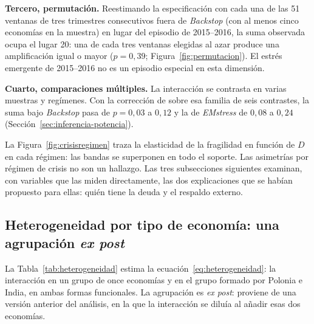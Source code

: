 \textbf{Tercero, permutación.} Reestimando la especificación con cada una de las 51 ventanas de tres trimestres consecutivos fuera de \textit{Backstop} (con al menos cinco economías en la muestra) en lugar del episodio de 2015--2016, la suma observada ocupa el lugar 20: una de cada tres ventanas elegidas al azar produce una amplificación igual o mayor ($p=0{,}39$; Figura~\ref{fig:permutacion}). El estrés emergente de 2015--2016 no es un episodio especial en esta dimensión.


\textbf{Cuarto, comparaciones múltiples.} La interacción se contrasta en varias muestras y regímenes. Con la corrección de \citet{Holm1979} sobre esa familia de seis contrastes, la suma bajo \textit{Backstop} pasa de $p=0{,}03$ a $0{,}12$ y la de \textit{EMstress} de $0{,}08$ a $0{,}24$ (Sección~\ref{sec:inferencia-potencia}).

La Figura~\ref{fig:crisisregimen} traza la elasticidad de la fragilidad en función de $D$ en cada régimen: las bandas se superponen en todo el soporte. Las asimetrías por régimen de crisis no son un hallazgo. Las tres subsecciones siguientes examinan, con variables que las miden directamente, las dos explicaciones que se habían propuesto para ellas: quién tiene la deuda y el respaldo externo.


\subsection{Heterogeneidad por tipo de economía: una agrupación \textit{ex post}}
\label{sec:robustez-heterogeneidad}

La Tabla~\ref{tab:heterogeneidad} estima la ecuación~\eqref{eq:heterogeneidad}: la interacción en un grupo de once economías y en el grupo formado por Polonia e India, en ambas formas funcionales. La agrupación es \textit{ex post}: proviene de una versión anterior del análisis, en la que la interacción se diluía al añadir esas dos economías.


